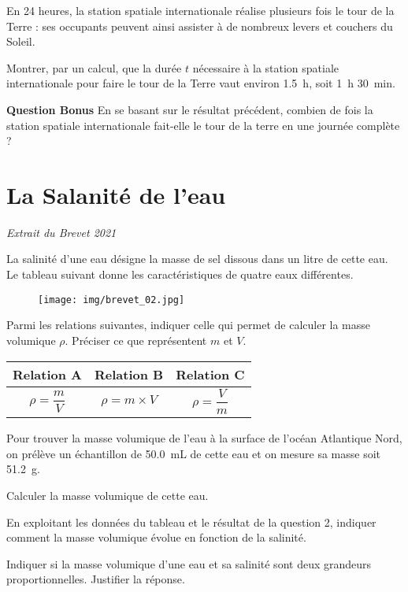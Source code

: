 \documentclass[answers]{exam}
\begin{document}
\begin{questions}
  En 24 heures, la station spatiale internationale réalise plusieurs fois le tour de la Terre : ses occupants peuvent ainsi assister à de nombreux levers et couchers du Soleil.
  
  Montrer, par un calcul, que la durée $t$ nécessaire à la station spatiale internationale pour faire le tour de la Terre vaut environ \SI{1.5}{\hour}, soit \SI{1}{\hour} \SI{30}{\minute}.
  
  
\question[2] \textbf{Question Bonus} En se basant sur le résultat précédent, combien de fois la station spatiale internationale fait-elle le tour de la terre en une journée complète ?


\section*{La Salanité de l'eau}

\textit{Extrait du Brevet 2021}
\vspace{1em}

La salinité d’une eau désigne la masse de sel dissous dans un litre de cette eau.
Le tableau suivant donne les caractéristiques de quatre eaux différentes.

\begin{figure}[H]
  \centering
  \texttt{[image: img/brevet\_02.jpg]}
\end{figure}

  \question[3] Parmi les relations suivantes, indiquer celle qui permet de calculer la masse volumique $\rho$. Préciser ce que représentent $m$ et $V$.

  \begin{center}
    \renewcommand{\arraystretch}{2} %
    \setlength{\tabcolsep}{20pt}   %
    \begin{tabular}{|c|c|c|}
    \hline
    Relation A & Relation B & Relation C \\
    \hline
    $\rho = \dfrac{m}{V}$ & $\rho = m \times V$ & $\rho = \dfrac{V}{m}$ \\
    \hline
    \end{tabular}
    \end{center}
  
  Pour trouver la masse volumique de l’eau à la surface de l’océan Atlantique Nord, on prélève un échantillon de \SI{50.0}{\milli\liter} de cette eau et on mesure sa masse soit \SI{51.2}{\gram}.
  
  
\question[4] Calculer la masse volumique de cette eau.
  
  
\question[2] En exploitant les données du tableau et le résultat de la question 2, indiquer comment la masse volumique évolue en fonction de la salinité.
  
  
\question[2] Indiquer si la masse volumique d’une eau et sa salinité sont deux grandeurs proportionnelles. Justifier la réponse.


  \end{questions}



\end{document}
